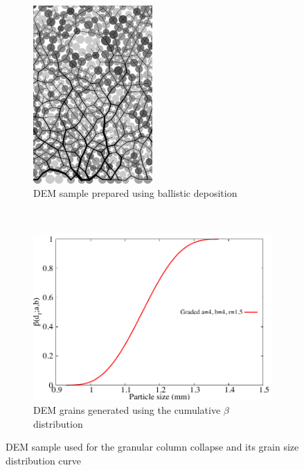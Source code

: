 \begin{figure}[tbhp]
\centering
\begin{subfigure}[b]{0.95\textwidth}
\centering
\includegraphics[width=0.5\textwidth]{a4b4r18}
\caption{DEM sample prepared using ballistic deposition}
\label{fig:a4b4r18}
\end{subfigure}
\\
\begin{subfigure}[b]{0.95\textwidth}
\centering
\includegraphics[width=\textwidth]{PSD}
\caption{DEM grains generated using the cumulative $\beta$ distribution}
\label{fig:PSD}
\end{subfigure}
\caption{DEM sample used for the granular column collapse and its grain size 
distribution curve}
\label{fig:DEM_Sample}
\end{figure}


